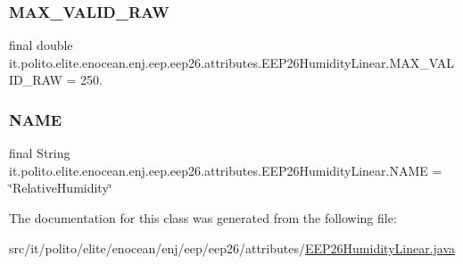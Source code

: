\subsubsection{\texorpdfstring{M\+A\+X\+\_\+\+V\+A\+L\+I\+D\+\_\+\+R\+AW}{MAX\_VALID\_RAW}}
{\footnotesize\ttfamily final double it.\+polito.\+elite.\+enocean.\+enj.\+eep.\+eep26.\+attributes.\+E\+E\+P26\+Humidity\+Linear.\+M\+A\+X\+\_\+\+V\+A\+L\+I\+D\+\_\+\+R\+AW = 250.\hspace{0.3cm}{\ttfamily [static]}}

\hypertarget{classit_1_1polito_1_1elite_1_1enocean_1_1enj_1_1eep_1_1eep26_1_1attributes_1_1_e_e_p26_humidity_linear_a66828dbdd7f99280c67414a7375b48df}{}\label{classit_1_1polito_1_1elite_1_1enocean_1_1enj_1_1eep_1_1eep26_1_1attributes_1_1_e_e_p26_humidity_linear_a66828dbdd7f99280c67414a7375b48df} 
\subsubsection{\texorpdfstring{N\+A\+ME}{NAME}}
{\footnotesize\ttfamily final String it.\+polito.\+elite.\+enocean.\+enj.\+eep.\+eep26.\+attributes.\+E\+E\+P26\+Humidity\+Linear.\+N\+A\+ME = \char`\"{}Relative\+Humidity\char`\"{}\hspace{0.3cm}{\ttfamily [static]}}



The documentation for this class was generated from the following file\+:\begin{DoxyCompactItemize}
\item 
src/it/polito/elite/enocean/enj/eep/eep26/attributes/\hyperlink{_e_e_p26_humidity_linear_8java}{E\+E\+P26\+Humidity\+Linear.\+java}\end{DoxyCompactItemize}

